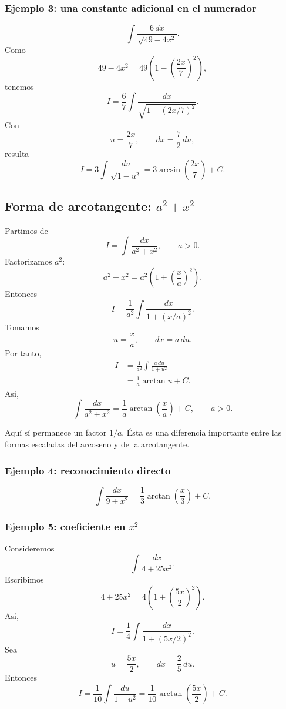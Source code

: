 \subsubsection*{Ejemplo 3: una constante adicional en el numerador}
\[
\int\frac{6\,dx}{\sqrt{49-4x^2}}.
\]
Como
\[
49-4x^2=49\left(1-\left(\frac{2x}{7}\right)^2\right),
\]
tenemos
\[
I=\frac67\int\frac{dx}{\sqrt{1-(2x/7)^2}}.
\]
Con
\[
u=\frac{2x}{7},\qquad dx=\frac72\,du,
\]
resulta
\[
I=3\int\frac{du}{\sqrt{1-u^2}}
=\boxed{3\arcsin\left(\frac{2x}{7}\right)+C}.
\]

\subsection{Forma de arcotangente: \texorpdfstring{$a^2+x^2$}{a2+x2}}

Partimos de
\[
I=\int\frac{dx}{a^2+x^2},\qquad a>0.
\]
Factorizamos $a^2$:
\[
a^2+x^2=a^2\left(1+\left(\frac{x}{a}\right)^2\right).
\]
Entonces
\[
I=\frac1{a^2}\int
\frac{dx}{1+(x/a)^2}.
\]
Tomamos
\[
u=\frac{x}{a},\qquad dx=a\,du.
\]
Por tanto,
\begin{align*}
I
&=\frac1{a^2}\int\frac{a\,du}{1+u^2}\\
&=\frac1a\arctan u+C.
\end{align*}
Así,
\[
\boxed{\int\frac{dx}{a^2+x^2}
=\frac1a\arctan\left(\frac{x}{a}\right)+C,\qquad a>0.}
\]

\begin{observacion}
Aquí sí permanece un factor $1/a$. Ésta es una diferencia importante entre
las formas escaladas del arcoseno y de la arcotangente.
\end{observacion}

\subsubsection*{Ejemplo 4: reconocimiento directo}
\[
\int\frac{dx}{9+x^2}
=\boxed{\frac13\arctan\left(\frac{x}{3}\right)+C}.
\]

\subsubsection*{Ejemplo 5: coeficiente en \texorpdfstring{$x^2$}{x2}}
Consideremos
\[
\int\frac{dx}{4+25x^2}.
\]
Escribimos
\[
4+25x^2=4\left(1+\left(\frac{5x}{2}\right)^2\right).
\]
Así,
\[
I=\frac14\int\frac{dx}{1+(5x/2)^2}.
\]
Sea
\[
u=\frac{5x}{2},\qquad dx=\frac25\,du.
\]
Entonces
\[
I=\frac1{10}\int\frac{du}{1+u^2}
=\boxed{\frac1{10}\arctan\left(\frac{5x}{2}\right)+C}.
\]

